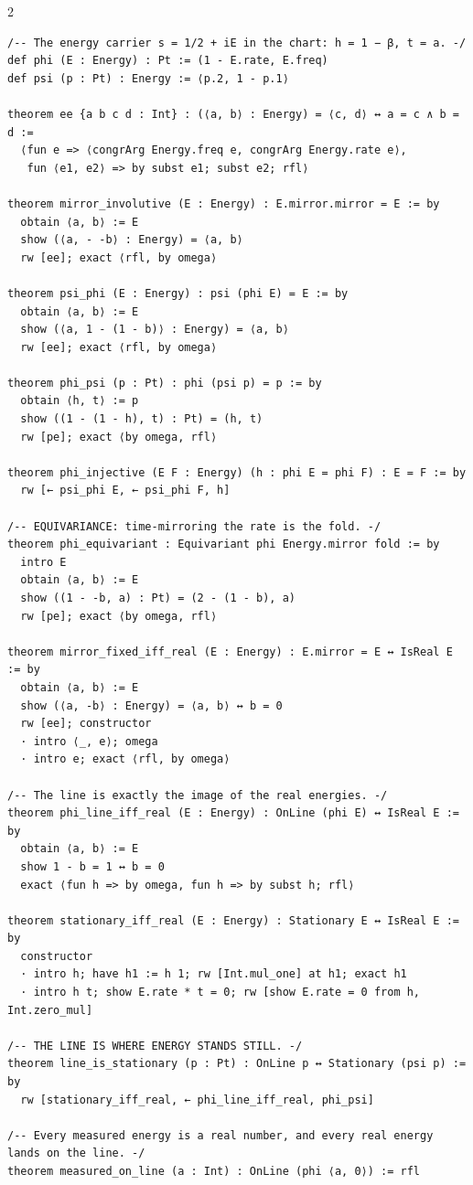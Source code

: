 \documentclass[10pt]{article}
\begin{document}
\begin{multicols}{2}
\begin{Verbatim}[fontsize=\fontsize{6.2}{7.2}\selectfont,breaklines,breakanywhere,breaksymbolleft={}]
/-- The energy carrier s = 1/2 + iE in the chart: h = 1 − β, t = a. -/
def phi (E : Energy) : Pt := (1 - E.rate, E.freq)
def psi (p : Pt) : Energy := ⟨p.2, 1 - p.1⟩

theorem ee {a b c d : Int} : (⟨a, b⟩ : Energy) = ⟨c, d⟩ ↔ a = c ∧ b = d :=
  ⟨fun e => ⟨congrArg Energy.freq e, congrArg Energy.rate e⟩,
   fun ⟨e1, e2⟩ => by subst e1; subst e2; rfl⟩

theorem mirror_involutive (E : Energy) : E.mirror.mirror = E := by
  obtain ⟨a, b⟩ := E
  show (⟨a, - -b⟩ : Energy) = ⟨a, b⟩
  rw [ee]; exact ⟨rfl, by omega⟩

theorem psi_phi (E : Energy) : psi (phi E) = E := by
  obtain ⟨a, b⟩ := E
  show (⟨a, 1 - (1 - b)⟩ : Energy) = ⟨a, b⟩
  rw [ee]; exact ⟨rfl, by omega⟩

theorem phi_psi (p : Pt) : phi (psi p) = p := by
  obtain ⟨h, t⟩ := p
  show ((1 - (1 - h), t) : Pt) = (h, t)
  rw [pe]; exact ⟨by omega, rfl⟩

theorem phi_injective (E F : Energy) (h : phi E = phi F) : E = F := by
  rw [← psi_phi E, ← psi_phi F, h]

/-- EQUIVARIANCE: time-mirroring the rate is the fold. -/
theorem phi_equivariant : Equivariant phi Energy.mirror fold := by
  intro E
  obtain ⟨a, b⟩ := E
  show ((1 - -b, a) : Pt) = (2 - (1 - b), a)
  rw [pe]; exact ⟨by omega, rfl⟩

theorem mirror_fixed_iff_real (E : Energy) : E.mirror = E ↔ IsReal E := by
  obtain ⟨a, b⟩ := E
  show (⟨a, -b⟩ : Energy) = ⟨a, b⟩ ↔ b = 0
  rw [ee]; constructor
  · intro ⟨_, e⟩; omega
  · intro e; exact ⟨rfl, by omega⟩

/-- The line is exactly the image of the real energies. -/
theorem phi_line_iff_real (E : Energy) : OnLine (phi E) ↔ IsReal E := by
  obtain ⟨a, b⟩ := E
  show 1 - b = 1 ↔ b = 0
  exact ⟨fun h => by omega, fun h => by subst h; rfl⟩

theorem stationary_iff_real (E : Energy) : Stationary E ↔ IsReal E := by
  constructor
  · intro h; have h1 := h 1; rw [Int.mul_one] at h1; exact h1
  · intro h t; show E.rate * t = 0; rw [show E.rate = 0 from h, Int.zero_mul]

/-- THE LINE IS WHERE ENERGY STANDS STILL. -/
theorem line_is_stationary (p : Pt) : OnLine p ↔ Stationary (psi p) := by
  rw [stationary_iff_real, ← phi_line_iff_real, phi_psi]

/-- Every measured energy is a real number, and every real energy lands on the line. -/
theorem measured_on_line (a : Int) : OnLine (phi ⟨a, 0⟩) := rfl


\end{Verbatim}
\end{multicols}
\end{document}
